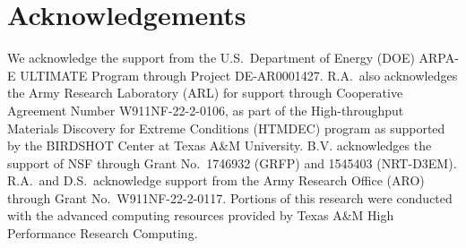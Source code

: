 \section*{Acknowledgements}
We acknowledge the support from the U.S.~Department of Energy (DOE) ARPA-E ULTIMATE Program through Project DE-AR0001427. R.A.~also acknowledges the Army Research Laboratory (ARL) for support through Cooperative Agreement Number W911NF-22-2-0106, as part of the High-throughput Materials Discovery for Extreme Conditions (HTMDEC) program as supported by the BIRDSHOT Center at Texas A\&M University. B.V. acknowledges the support of NSF through Grant No.~1746932 (GRFP) and 1545403 (NRT-D3EM). R.A.~and D.S.~acknowledge support from the Army Research Office (ARO) through Grant No.~W911NF-22-2-0117. Portions of this research were conducted with the advanced computing resources provided by Texas A\&M High Performance Research Computing.